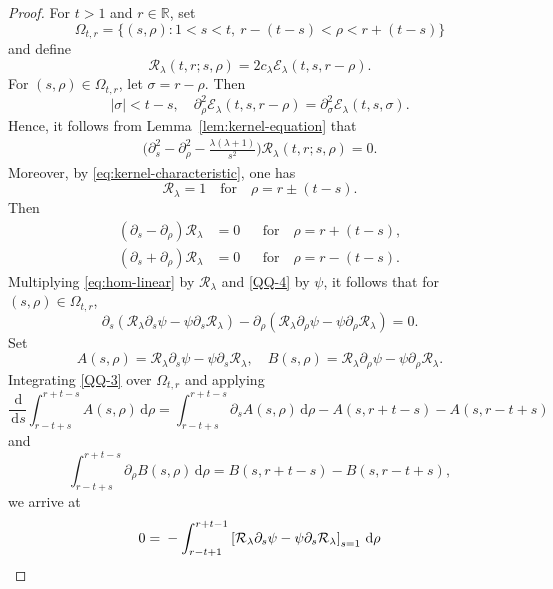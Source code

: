 \documentclass[11pt,twoside]{article}
\newcommand{\R}{\mathbb R}
\newcommand{\p}{\partial}
\newcommand{\f}{\frac}
\newcommand{\dd}{\,\mathrm{d}}
\newcommand{\Ecal}{\mathcal E}
\newcommand{\Rcal}{\mathcal R}
\theoremstyle{plain}
\theoremstyle{definition}
\theoremstyle{remark}
\numberwithin{equation}{section}
\begin{document}
\begin{proof}
For $t>1$ and $r\in\R$, set
\begin{equation}\label{QQ-5'}
\Omega_{t,r}
=
\bigl\{(s,\rho):1<s<t,\
r-(t-s)<\rho<r+(t-s)\bigr\}
\end{equation}
and define
\begin{equation}\label{QQ-5}
\Rcal_\lambda(t,r;s,\rho)
=
2c_\lambda\Ecal_\lambda(t,s,r-\rho).
\end{equation}
For $(s,\rho)\in\Omega_{t,r}$, let $\sigma=r-\rho$. Then
\[
|\sigma|<t-s,
\quad
\p_\rho^2\Ecal_\lambda(t,s,r-\rho)
=
\p_\sigma^2\Ecal_\lambda(t,s,\sigma).
\]
Hence, it follows from Lemma~\ref{lem:kernel-equation} that
\begin{equation}\label{QQ-4}
\begin{aligned}
\big(
\p_s^2-\p_\rho^2-\f{\lambda(\lambda+1)}{s^2}
\big)
\Rcal_\lambda(t,r;s,\rho)
=0.
\end{aligned}
\end{equation}
Moreover, by \eqref{eq:kernel-characteristic}, one has
\begin{equation}\label{QQ-1}
\Rcal_\lambda=1
\quad\text{for}\quad \rho=r\pm(t-s).
\end{equation}
Then
\begin{equation}\label{QQ-2}
\begin{aligned}
(\p_s-\p_\rho)\Rcal_\lambda&=0
&&\text{for}\quad  \rho=r+(t-s),\\
(\p_s+\p_\rho)\Rcal_\lambda&=0
&&\text{for}\quad  \rho=r-(t-s).
\end{aligned}
\end{equation}
Multiplying \eqref{eq:hom-linear} by $\Rcal_\lambda$ and \eqref{QQ-4} by $\psi$, it follows that for $(s,\rho)\in\Omega_{t,r}$,
\begin{equation}\label{QQ-3}
\p_s\left(
\Rcal_\lambda\p_s\psi-\psi\p_s\Rcal_\lambda
\right)
-
\p_\rho\left(
\Rcal_\lambda\p_\rho\psi-\psi\p_\rho\Rcal_\lambda
\right)
=0.
\end{equation}
Set
\[
A(s,\rho)=\Rcal_\lambda\p_s\psi-\psi\p_s\Rcal_\lambda,
\quad
B(s,\rho)=\Rcal_\lambda\p_\rho\psi-\psi\p_\rho\Rcal_\lambda.
\]
Integrating \eqref{QQ-3} over $\Omega_{t,r}$ and applying
\[
\f{\dd}{\dd s}\int_{r-t+s}^{r+t-s}A(s,\rho)\dd\rho
=
\int_{r-t+s}^{r+t-s}\p_sA(s,\rho)\dd\rho
-A(s,r+t-s)-A(s,r-t+s)
\]
and
\[
\int_{r-t+s}^{r+t-s}\p_\rho B(s,\rho)\dd\rho
=
B(s,r+t-s)-B(s,r-t+s),
\]
we arrive at
\begin{align}
0={}&
-\int_{r-t+1}^{r+t-1}
\left[
\Rcal_\lambda\p_s\psi-\psi\p_s\Rcal_\lambda
\right]_{s=1}\dd\rho\notag\\

\end{align}
\end{proof}
\end{document}
